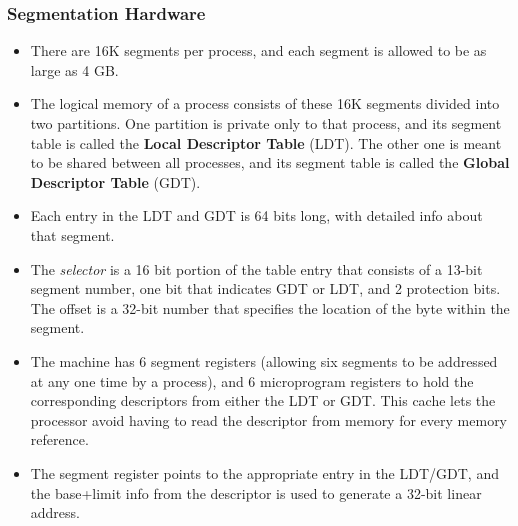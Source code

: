 \documentclass{article}
\theoremstyle{plain}
\theoremstyle{definition}
\begin{document}
\subsubsection{Segmentation Hardware}
    \begin{itemize}
        \item There are 16K segments per process, and each segment is allowed to be as large as 4 GB.
        
        \item The logical memory of a process consists of these 16K segments divided into two partitions. One partition is private only to that process, and its segment table is called the \textbf{Local Descriptor Table} (LDT). The other one is meant to be shared between all processes, and its segment table is called the \textbf{Global Descriptor Table} (GDT).
        
        \item Each entry in the LDT and GDT is 64 bits long, with detailed info about that segment. 
        
        \item The \textit{selector} is a 16 bit portion of the table entry that consists of a 13-bit segment number, one bit that indicates GDT or LDT, and 2 protection bits. The offset is a 32-bit number that specifies the location of the byte within the segment. 
        
        \item The machine has 6 segment registers (allowing six segments to be addressed at any one time by a process), and 6 microprogram registers to hold the corresponding descriptors from either the LDT or GDT. This cache lets the processor avoid having to read the descriptor from memory for every memory reference.
        
        \item The segment register points to the appropriate entry in the LDT/GDT, and the base+limit info from the descriptor is used to generate a 32-bit linear address. 
    \end{itemize}
\end{document}
